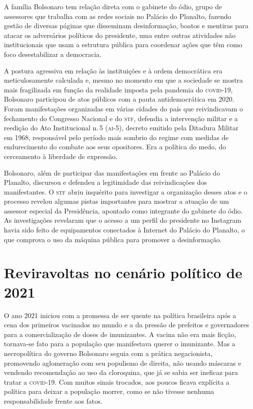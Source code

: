 A família Bolsonaro tem relação direta com o gabinete do ódio, grupo de
assessores que trabalha com as redes sociais no Palácio do Planalto,
fazendo gestão de diversas páginas que disseminam desinformação, boatos
e mentiras para atacar os adversários políticos do presidente, uma entre
outras atividades não institucionais que usam a estrutura pública para
coordenar ações que têm como foco desestabilizar a democracia.

A postura agressiva em relação às instituições e à ordem democrática era
meticulosamente calculada e, mesmo no momento em que a sociedade se
mostra mais fragilizada em função da realidade imposta pela pandemia do
\textsc{covid-19}, Bolsonaro participou de atos públicos com a pauta
antidemocrática em 2020. Foram manifestações organizadas em várias
cidades do país que reivindicavam o fechamento do Congresso Nacional e
do \textsc{stf}, defendia a intervenção militar e a
reedição do Ato Institucional n.\,5 (\textsc{ai-5}), decreto emitido pela Ditadura
Militar em 1968, responsável pelo período mais sombrio do regime com
medidas de endurecimento do combate aos seus opositores. Era a política
do medo, do cerceamento à liberdade de expressão.

Bolsonaro, além de participar das manifestações em frente ao Palácio do
Planalto, discursou e defendeu a legitimidade das reivindicações dos
manifestantes. O \textsc{stf} abriu inquérito para investigar a organização
desses atos e o processo revelou algumas pistas importantes para mostrar
a atuação de um assessor especial da Presidência, apontado como
integrante do gabinete do ódio. As investigações revelaram que o acesso a um
perfil do presidente no Instagram havia sido feito de equipamentos
conectados à Internet do Palácio do Planalto, o que comprova o uso da
máquina pública para promover a desinformação.

\section{Reviravoltas no cenário político de 2021}

O ano 2021 iniciou com a promessa de ser quente na política brasileira
após a cena dos primeiros vacinados no mundo e a da pressão de prefeitos e
governadores para a comercialização de doses de imunizantes. A vacina
não era mais ficção, tornava-se fato para a população que manifestava
querer o imunizante. Mas a necropolítica do governo Bolsonaro seguia com
a prática negacionista, promovendo aglomeração com seu populismo de
direita, não usando máscaras e vendendo recomendação ao uso da
cloroquina, que já se sabia ser ineficaz para tratar a \textsc{covid-19}. Com
muitos sinais trocados, aos poucos ficava explícita a política para
deixar a população morrer, como se não tivesse nenhuma responsabilidade
frente aos fatos.

